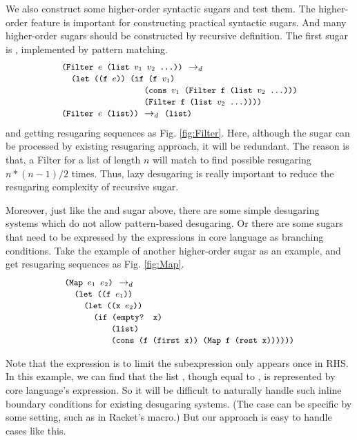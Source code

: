 We also construct some higher-order syntactic sugars and test them. The higher-order feature is important for constructing practical syntactic sugars. And many higher-order sugars should be constructed by recursive definition. The first sugar is , implemented by pattern matching.
\[\begin{array}{l}
\texttt{\small(Filter $e$ (list $v_1$ $v_2$ ...))} ~\rightarrow_d~\\
\quad
\texttt{\small (let ((f $e$)) (if (f $v_1$)}\\
\qquad\qquad\qquad\qquad\;\;\texttt{\small (cons $v_1$ (Filter f (list $v_2$ ...)))}\\
\qquad\qquad\qquad\qquad\;\;\texttt{\small (Filter f (list $v_2$ ...))))}\\

\texttt{\small(Filter $e$ (list))} ~\rightarrow_d~ \texttt{\small(list)}
\end{array}\]
and getting resugaring sequences as Fig.  \ref{fig:Filter}.
Here, although the sugar can be processed by existing resugaring approach, it will be redundant. The reason is that, a Filter for a list of length $n$ will match to find possible resugaring $n*(n-1)/2$ times. Thus, lazy desugaring is really important to reduce the resugaring complexity of recursive sugar.

Moreover, just like the  and  sugar above, there are some simple desugaring systems which do not allow pattern-based desugaring. Or there are some sugars that need to be expressed by the expressions in core language as branching conditions. Take the example of another higher-order sugar  as an example, and get resugaring sequences as Fig.  \ref{fig:Map}.
\[
\begin{array}{l}
\texttt{\small(Map $e_1$ $e_2$)} ~\rightarrow_d~\\
\quad\texttt{\small (let ((f $e_1$))}\\
\qquad\texttt{\small(let ((x $e_2$))}\\
\qquad\quad

\texttt{\small(if (empty? x)}\\
\qquad\qquad\;\;\;\texttt{\small(list)}\\
\qquad\qquad\;\;\;\texttt{\small(cons (f (first x)) (Map f (rest x))))))}


\end{array}
\]



Note that the  expression is to limit the subexpression only appears once in RHS. In this example, we can find that the list , though equal to , is represented by core language's expression. So it will be difficult to naturally handle such inline boundary conditions for existing desugaring systems. (The case can be specific by some setting, such as  in Racket's macro.) But our approach is easy to handle cases like this. 

